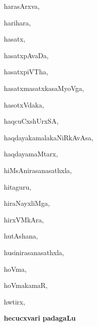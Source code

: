 \begin{multicols}{3}
{\noindent
{harasArxva}, \pageref{harasArxva}

\noindent
{harihara}, \pageref{harihara}

\noindent
{hasatx}, \pageref{hasatx}

\noindent
{hasatxpAvaDa}, \pageref{hasatxpAvaDa}

\noindent
{hasatxpiVTha}, \pageref{hasatxpiVTha}

\noindent
{hasatxmasatxkasaMyoVga}, \pageref{hasatxmasatxkasaMyoVga}

\noindent
{hasotxVdaka}, \pageref{hasotxVdaka}

\noindent
{haqcuCxshUrxSA}, \pageref{haqcuCxshUrxSA}

\noindent
{haqdayakamalakaNiRkAvAsa}, \pageref{haqdayakamalakaNiRkAvAsa}

\noindent
{haqdayamaMtarx}, \pageref{haqdayamaMtarx}

\noindent
{hiMsAnirasanasathxla}, \pageref{hiMsAnirasanasathxla}

\noindent
{hitaguru}, \pageref{hitaguru}

\noindent
{hiraNayxliMga}, \pageref{hiraNayxliMga}

\noindent
{hirxVMkAra}, \pageref{hirxVMkAra}

\noindent
{hutAshana}, \pageref{hutAshana}

\noindent
{husinirasanasathxla}, \pageref{husinirasanasathxla}

\noindent
{hoVma}, \pageref{hoVma}

\noindent
{hoVmakamaR}, \pageref{hoVmakamaR}

\noindent
{hwtirx}, \pageref{hwtirx}
}
\end{multicols}

\noindent
\vskip 1cm

\noindent
\begin{center}
{\Large\bfseries hecucxvari padagaLu}
\end{center}
\medskip

